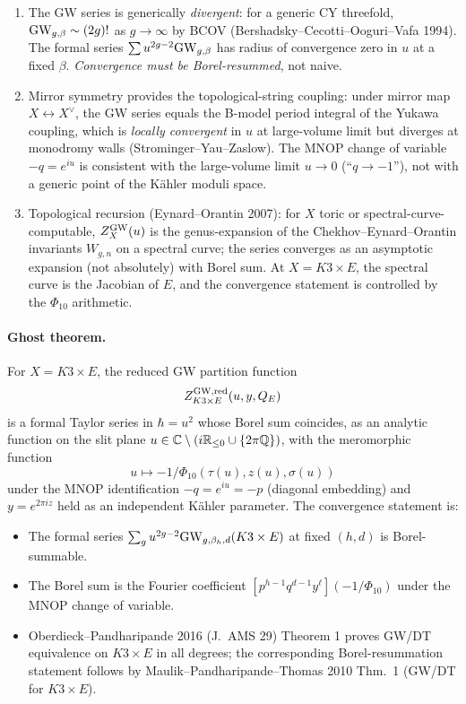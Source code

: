 \begin{enumerate}[label=\textbf{O.\arabic*},leftmargin=1.5em]
\item The GW series is generically \emph{divergent}: for a
  generic CY threefold, $\mathrm{GW}_{g,\beta}\sim(2g)!$ as $g\to\infty$
  by BCOV (Bershadsky--Cecotti--Ooguri--Vafa 1994). The formal
  series $\sum u^{2g-2}\mathrm{GW}_{g,\beta}$ has radius of convergence
  zero in $u$ at a fixed $\beta$. \emph{Convergence must be
  Borel-resummed}, not naive.
\item Mirror symmetry provides the topological-string coupling:
  under mirror map $X\leftrightarrow X^\vee$, the GW series
  equals the B-model period integral of the Yukawa coupling, which
  is \emph{locally convergent} in $u$ at large-volume limit but
  diverges at monodromy walls (Strominger--Yau--Zaslow). The
  MNOP change of variable $-q=e^{iu}$ is consistent with the
  large-volume limit $u\to 0$ (``$q\to -1$''), not with a generic
  point of the Kähler moduli space.
\item Topological recursion (Eynard--Orantin 2007): for $X$ toric
  or spectral-curve-computable, $Z^{\mathrm{GW}}_X(u)$ is the
  genus-expansion of the Chekhov--Eynard--Orantin invariants
  $W_{g,n}$ on a spectral curve; the series converges as an
  asymptotic expansion (not absolutely) with Borel sum. At
  $X=K3\times E$, the spectral curve is the Jacobian of
  $E$, and the convergence statement is controlled by the
  $\Phi_{10}$ arithmetic.
\end{enumerate}

\paragraph{Ghost theorem.}
For $X=K3\times E$, the reduced GW partition function
\[
Z^{\mathrm{GW},\mathrm{red}}_{K3\times E}(u,y,Q_E)
\]
is a formal Taylor series in $\hbar=u^2$ whose Borel sum
coincides, as an analytic function on the slit plane
$u\in\mathbb{C}\setminus(i\mathbb{R}_{\le 0}\cup\{2\pi\mathbb{Q}\})$, with the
meromorphic function
\[
u\mapsto -1/\Phi_{10}(\tau(u),z(u),\sigma(u))
\]
under the MNOP identification $-q=e^{iu}=-p$ (diagonal
embedding) and $y=e^{2\pi iz}$ held as an independent Kähler
parameter. The convergence statement is:

\begin{itemize}[leftmargin=1.5em]
\item The formal series
  $\sum_g u^{2g-2}\mathrm{GW}_{g,\beta_h,d}(K3\times E)$ at fixed
  $(h,d)$ is Borel-summable.
\item The Borel sum is the Fourier coefficient
  $[p^{h-1}q^{d-1}y^\ell](-1/\Phi_{10})$ under the MNOP change of
  variable.
\item Oberdieck--Pandharipande 2016 (J.\ AMS 29) Theorem 1 proves
  GW/DT equivalence on $K3\times E$ in all degrees; the
  corresponding Borel-resummation statement follows by Maulik--Pandharipande--Thomas
  2010 Thm.\ 1 (GW/DT for $K3\times E$).
\end{itemize}


